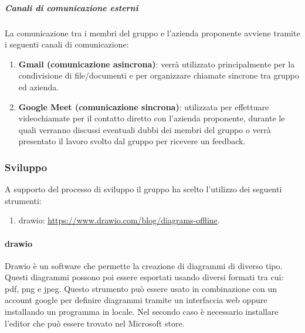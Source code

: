 \subparagraph{Canali di comunicazione esterni}
La comunicazione tra i membri del gruppo e l'azienda proponente avviene tramite i seguenti canali di comunicazione:
\begin{enumerate}
    \item \textbf{Gmail (comunicazione asincrona)}: verrà utilizzato principalmente per la condivisione di file/documenti e per organizzare chiamate sincrone tra gruppo ed azienda.

    \item \textbf{Google Meet (comunicazione sincrona)}: utilizzata per effettuare videochiamate per il contatto diretto con l'azienda proponente, durante le quali verranno discussi eventuali dubbi dei membri del gruppo o verrà presentato il lavoro svolto dal gruppo per ricevere un feedback.
\end{enumerate}


\subsubsection{Sviluppo}
A supporto del processo di sviluppo il gruppo ha scelto l'utilizzo dei seguenti strumenti:
\begin{enumerate}
    \item drawio: \href{https://www.drawio.com/blog/diagrams-offline}{https://www.drawio.com/blog/diagrams-offline}.
\end{enumerate}

\paragraph{drawio}
Drawio è un software che permette la creazione di diagrammi di diverso tipo.
Questi diagrammi possono poi essere esportati usando diversi formati tra cui: pdf, png e jpeg.
Questo strumento può essere usato in combinazione con un account google per definire diagrammi tramite un interfaccia web oppure installando un programma in locale.
Nel secondo caso è necessario installare l'editor che può essere trovato nel Microsoft store. 
